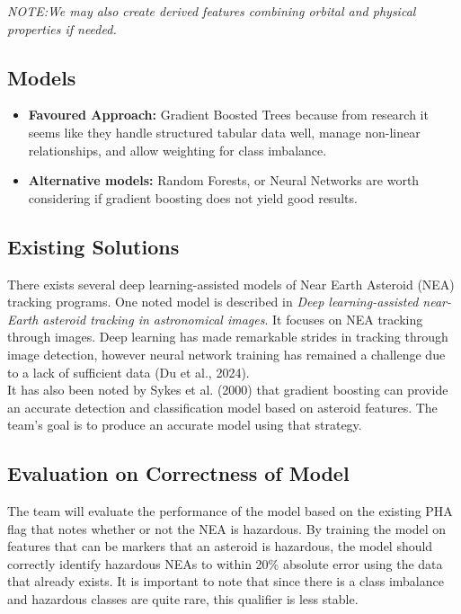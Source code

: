 \documentclass[12pt]{article}
\begin{document}
\emph{NOTE:We may also create derived features combining orbital and physical properties if needed.}


\subsection*{Models}
\begin{itemize}
    \item \textbf{Favoured Approach:} Gradient Boosted Trees because from research it seems like they handle structured tabular data well, manage non-linear relationships, and allow weighting for class imbalance.

    \item \textbf{Alternative models:} Random Forests, or Neural Networks are worth considering if gradient boosting does not yield good results.
    
\end{itemize}

\subsection*{Existing Solutions}
\medskip
There exists several deep learning-assisted models of Near Earth Asteroid (NEA) tracking programs. One noted model is described in \textit{Deep learning-assisted near-Earth asteroid tracking in astronomical images}. It focuses on NEA tracking through images. Deep learning has made remarkable strides in tracking through image detection, however neural network training has remained a challenge due to a lack of sufficient data (Du et al., 2024). \\

It has also been noted by Sykes et al. (2000) that gradient boosting can provide an accurate detection and classification model based on asteroid features. The team's goal is to produce an accurate model using that strategy. 

\subsection*{Evaluation on Correctness of Model}

The team will evaluate the performance of the model based on the existing PHA flag that notes whether or not the NEA is hazardous. By training the model on features that can be markers that an asteroid is hazardous, the model should correctly identify hazardous NEAs to within 20\% absolute error using the data that already exists. It is important to note that since there is a class imbalance and hazardous classes are quite rare, this qualifier is less stable. 
\end{document}
